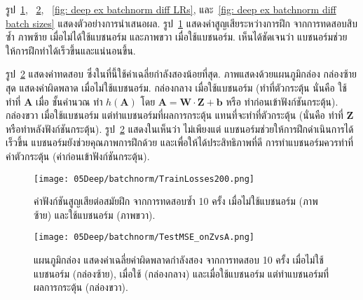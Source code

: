 \begin{Exercise}
รูป~\ref{fig: deep ex batchnorm effective},
~\ref{fig: deep ex batchnorm on A vs Z},
~\ref{fig: deep ex batchnorm diff LRs},
และ~\ref{fig: deep ex batchnorm diff batch sizes}
แสดงตัวอย่างการนำเสนอผล.
รูป~\ref{fig: deep ex batchnorm effective}
แสดงค่าสูญเสียระหว่างการฝึก จากการทดสอบสิบซ้ำ
ภาพซ้าย เมื่อไม่ได้ใช้แบชนอร์ม
และภาพขวา เมื่อใช้แบชนอร์ม.
เห็นได้ชัดเจนว่า
แบชนอร์มช่วยให้การฝึกทำได้เร็วขึ้นและแน่นอนขึ้น.

รูป~\ref{fig: deep ex batchnorm on A vs Z}
แสดงค่าทดสอบ ซึ่งในที่นี้ใช้ค่าเฉลี่ยกำลังสองน้อยที่สุด.
ภาพแสดงด้วยแผนภูมิกล่อง
กล่องซ้ายสุด
แสดงค่าผิดพลาด
เมื่อไม่ใช้แบชนอร์ม.
กล่องกลาง
เมื่อใช้แบชนอร์ม (ทำที่ตัวกระตุ้น นั่นคือ ใช้ ทำที่ $\bm{A}$ เมื่อ
ชั้นคำนวณ ทำ $h(\bm{A})$
โดย $\bm{A} = \bm{W} \cdot \bm{Z} + \bm{b}$
หรือ ทำก่อนเข้าฟังก์ชันกระตุ้น).
กล่องขวา
เมื่อใช้แบชนอร์ม แต่ทำแบชนอร์มที่ผลการกระตุ้น
แทนที่จะทำที่ตัวกระตุ้น
(นั่นคือ ทำที่ $\bm{Z}$
หรือทำหลังฟังก์ชันกระตุ้น).
รูป~\ref{fig: deep ex batchnorm on A vs Z}
แสดงในเห็นว่า
ไม่เพียงแต่ แบชนอร์มช่วยให้การฝึกดำเนินการได้เร็วขึ้น
แบชนอร์มยังช่วยคุณภาพการฝึกด้วย
และเพื่อให้ได้ประสิทธิภาพที่ดี
การทำแบชนอร์มควรทำที่ค่าตัวกระตุ้น (ค่าก่อนเข้าฟังก์ชันกระตุ้น).



\begin{figure}[H]
	\begin{center}	
		\texttt{[image: 05Deep/batchnorm/TrainLosses200.png]}
	\end{center}		
\caption[ค่าฟังก์ชันสูญเสียต่อสมัยฝึก เมื่อไม่ใช้และใช้แบชนอร์ม]{ค่าฟังก์ชันสูญเสียต่อสมัยฝึก จากการทดสอบซ้ำ 10 ครั้ง เมื่อไม่ใช้แบชนอร์ม (ภาพซ้าย) และใช้แบชนอร์ม (ภาพขวา).}
	\label{fig: deep ex batchnorm effective}
\end{figure}
%


\begin{figure}[H]
	\begin{center}	
			\texttt{[image: 05Deep/batchnorm/TestMSE\_onZvsA.png]}
%		
	\end{center}		
\caption[ค่าผิดพลาดเมื่อไม่ใช้และใช้แบชนอร์ม]{แผนภูมิกล่อง แสดงค่าเฉลี่ยค่าผิดพลาดกำลังสอง จากการทดสอบ 10 ครั้ง
เมื่อไม่ใช้แบชนอร์ม (กล่องซ้าย), 	
เมื่อใช้ (กล่องกลาง)
และเมื่อใช้แบชนอร์ม แต่ทำแบชนอร์มที่ผลการกระตุ้น (กล่องขวา).}
	\label{fig: deep ex batchnorm on A vs Z}
\end{figure}
%


\end{Exercise}
